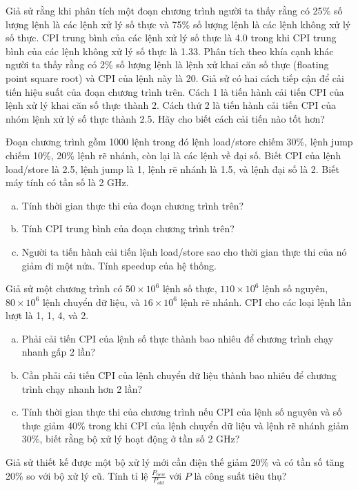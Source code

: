 \begin{exer}
Giả sử rằng khi phân tích một đoạn chương trình người ta thấy rằng có 25\% số lượng lệnh là các lệnh xử lý số thực và 75\% số lượng lệnh là các lệnh không xử lý số thực. CPI trung bình của các lệnh xử lý số thực là 4.0 trong khi CPI trung bình của các lệnh không xử lý số thực là 1.33. Phân tích theo khía cạnh khác người ta thấy rằng có 2\% số lượng lệnh là lệnh xử khai căn số thực (floating point square root) và CPI của lệnh này là 20. Giả sử có hai cách tiếp cận để cải tiến hiệu suất của đoạn chương trình trên. Cách 1 là tiến hành cải tiến CPI của lệnh xử lý khai căn số thực thành 2. Cách thứ 2 là tiến hành cải tiến CPI của nhóm lệnh xử lý số thực thành 2.5. Hãy cho biết cách cải tiến nào tốt hơn?
\end{exer}

\begin{exer}
Đoạn chương trình gồm 1000 lệnh trong đó lệnh load/store chiếm 30\%, lệnh jump chiếm 10\%, 20\% lệnh rẽ nhánh, còn lại là các lệnh về đại số. Biết CPI của lệnh load/store là 2.5, lệnh jump là 1, lệnh rẽ nhánh là 1.5, và lệnh đại số là 2. Biết máy tính có tần số là 2 GHz.
\begin{enumerate}[a.]
\item Tính thời gian thực thi của đoạn chương trình trên?
\item Tính CPI trung bình của đoạn chương trình trên?
\item Người ta tiến hành cải tiến lệnh load/store sao cho thời gian thực thi của nó giảm đi một nửa. Tính speedup của hệ thống.
\end{enumerate}
\end{exer}

\begin{exer}
Giả sử một chương trình có $50 \times 10^6$ lệnh số thực, $110 \times 10^6$ lệnh số nguyên, $80 \times 10^6$ lệnh chuyển dữ liệu, và $16 \times 10^6$ lệnh rẽ nhánh. CPI cho các loại lệnh lần lượt là 1, 1, 4, và 2.
\begin{enumerate}[a.]
\item Phải cải tiến CPI của lệnh số thực thành bao nhiêu để chương trình chạy nhanh gấp 2 lần?
\item Cần phải cải tiến CPI của lệnh chuyển dữ liệu thành bao nhiêu để chương trình chạy nhanh hơn 2 lần?
\item Tính thời gian thực thi của chương trình nếu CPI của lệnh số nguyên và số thực giảm 40\% trong khi CPI của lệnh chuyển dữ liệu và lệnh rẽ nhánh giảm 30\%, biết rằng bộ xử lý hoạt động ở tần số 2 GHz?
\end{enumerate}
\end{exer}

\begin{exer}
Giả sử thiết kế được một bộ xử lý mới cần điện thế giảm 20\% và có tần số tăng 20\% so với bộ xử lý cũ. Tính tỉ lệ $\frac{P_{new}}{P_{old}}$ với $P$ là công suất tiêu thụ?
\end{exer}